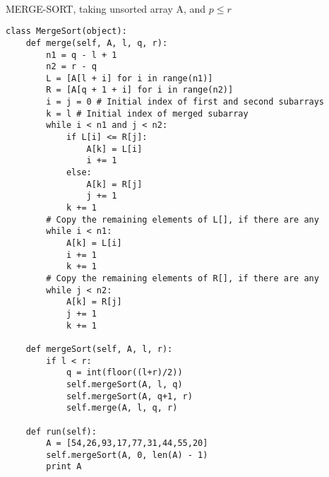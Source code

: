 \documentclass{article}
\begin{document}
\begin{algorithm}[H]
    \Indm{} \\
    \Indp
    \caption{MERGE-SORT, taking unsorted array A, and $p \leq r$}
\end{algorithm}
\begin{verbatim}
class MergeSort(object):
    def merge(self, A, l, q, r):
        n1 = q - l + 1
        n2 = r - q
        L = [A[l + i] for i in range(n1)]
        R = [A[q + 1 + i] for i in range(n2)]
        i = j = 0 # Initial index of first and second subarrays
        k = l # Initial index of merged subarray
        while i < n1 and j < n2:
            if L[i] <= R[j]:
                A[k] = L[i]
                i += 1
            else:
                A[k] = R[j]
                j += 1
            k += 1
        # Copy the remaining elements of L[], if there are any
        while i < n1:
            A[k] = L[i]
            i += 1
            k += 1
        # Copy the remaining elements of R[], if there are any
        while j < n2:
            A[k] = R[j]
            j += 1
            k += 1

    def mergeSort(self, A, l, r):
        if l < r:
            q = int(floor((l+r)/2))
            self.mergeSort(A, l, q)
            self.mergeSort(A, q+1, r)
            self.merge(A, l, q, r)
            
    def run(self):
        A = [54,26,93,17,77,31,44,55,20]
        self.mergeSort(A, 0, len(A) - 1)
        print A
\end{verbatim}
    
    
\end{document}
